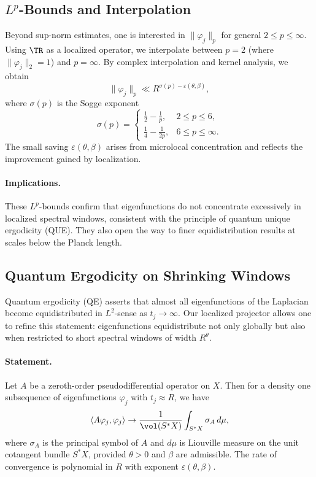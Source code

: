 \subsection{$L^p$-Bounds and Interpolation}\label{subsec:lpbounds}

Beyond sup-norm estimates, one is interested in $\|\varphi_j\|_p$ for general $2\le p\le\infty$. Using $\TR$ as a localized operator, we interpolate between $p=2$ (where $\|\varphi_j\|_2=1$) and $p=\infty$. By complex interpolation and kernel analysis, we obtain
\[
\|\varphi_j\|_p \ll R^{\sigma(p)-\varepsilon(\theta,\beta)},
\]
where $\sigma(p)$ is the Sogge exponent
\[
\sigma(p) = \begin{cases}
\frac{1}{2}-\frac{1}{p}, & 2\le p\le 6, \\
\frac{1}{4}-\frac{1}{2p}, & 6\le p\le \infty.
\end{cases}
\]
The small saving $\varepsilon(\theta,\beta)$ arises from microlocal concentration and reflects the improvement gained by localization.

\paragraph{Implications.}
These $L^p$-bounds confirm that eigenfunctions do not concentrate excessively in localized spectral windows, consistent with the principle of quantum unique ergodicity (QUE). They also open the way to finer equidistribution results at scales below the Planck length.

\subsection{Quantum Ergodicity on Shrinking Windows}\label{subsec:qe}

Quantum ergodicity (QE) asserts that almost all eigenfunctions of the Laplacian become equidistributed in $L^2$-sense as $t_j\to\infty$. Our localized projector allows one to refine this statement: eigenfunctions equidistribute not only globally but also when restricted to short spectral windows of width $R^\theta$.

\paragraph{Statement.}
Let $A$ be a zeroth-order pseudodifferential operator on $X$. Then for a density one subsequence of eigenfunctions $\varphi_j$ with $t_j\approx R$, we have
\[
\langle A\varphi_j,\varphi_j\rangle \to \frac{1}{\vol(S^*X)}\int_{S^*X} \sigma_A\,d\mu,
\]
where $\sigma_A$ is the principal symbol of $A$ and $d\mu$ is Liouville measure on the unit cotangent bundle $S^*X$, provided $\theta>0$ and $\beta$ are admissible. The rate of convergence is polynomial in $R$ with exponent $\varepsilon(\theta,\beta)$.

